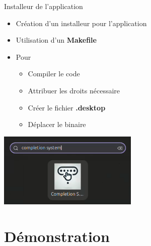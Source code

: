 \begin{frame}{Installeur de l'application}
	\begin{itemize}
		\item Création d'un installeur pour l'application
		\item Utilisation d'un \textbf{Makefile}
		\item Pour
		      \begin{itemize}
			      \item Compiler le code
			      \item Attribuer les droits nécessaire
			      \item Créer le fichier \textbf{.desktop}
			      \item Déplacer le binaire
		      \end{itemize}
	\end{itemize}
	\begin{center}
		\includegraphics[width=0.5\textwidth]{images/application.png}
	\end{center}

\end{frame}

\section{Démonstration}%
